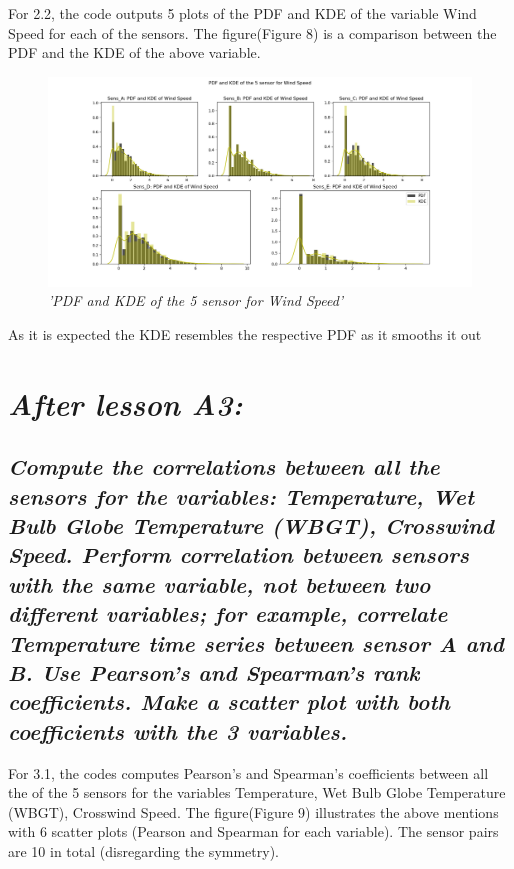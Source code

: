 \documentclass[a4paper,12pt]{article} %
\begin{document}
For 2.2, the code outputs 5 plots of the PDF and KDE 
of the variable Wind Speed for each of the sensors. The figure(Figure 8) is a 
comparison between the PDF and the KDE of the above variable.



\begin{figure}[H]
\centering
\includegraphics[width=\textwidth]{Graphs/PDF_and_KDE_of_the_5_sensor_-_Wind_Speed.png}
\caption{\it'PDF and KDE of the 5 sensor for Wind Speed'}
\end{figure}




As it is expected the KDE resembles the respective PDF as it smooths it out 




\section{\it After lesson A3:}
\subsection{\it Compute the correlations between all the sensors for the variables: Temperature, Wet Bulb Globe Temperature (WBGT), Crosswind Speed. Perform correlation between sensors with the same variable, not between two different variables; for example, correlate Temperature time series between sensor A and B. Use Pearson’s and Spearman’s rank coefficients. Make a scatter plot with both coefficients with the 3 variables.}




For 3.1, the codes computes Pearson’s and Spearman’s 
coefficients between all the of the 5 sensors for the variables Temperature, 
Wet Bulb Globe Temperature (WBGT), Crosswind Speed. The figure(Figure 9) illustrates the above mentions with 6 scatter plots 
(Pearson and Spearman for each variable). The sensor pairs are 10 in total (disregarding the symmetry).
\end{document}
